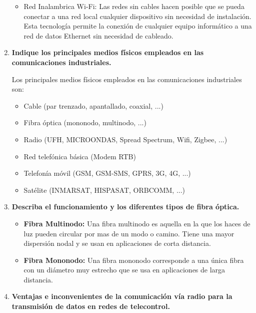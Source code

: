 \documentclass[10pt,a4paper,spanish]{article}
\begin{document}
\begin{enumerate}
\begin{itemize}
      \item Red Inalambrica Wi-Fi: Las redes sin cables hacen posible que se pueda conectar a una red local cualquier dispositivo sin necesidad de instalación. Esta tecnología permite la conexión de cualquier equipo informático a una red de datos Ethernet sin necesidad de cableado.
    \end{itemize}

    \noindent

    \item \textbf{Indique los principales medios físicos empleados en las comunicaciones industriales.}

    \noindent
    Los principales medios físicos empleados en las comunicaciones industriales son:

    \begin{itemize}
      \item Cable (par trenzado, apantallado, coaxial, ...)
      \item Fibra óptica (mononodo, multinodo, ...)
      \item Radio (UFH, MICROONDAS, Spread Spectrum, Wifi, Zigbee, ...)
      \item Red telefónica básica (Modem RTB)
      \item Telefonía móvil (GSM, GSM-SMS, GPRS, 3G, 4G, ...)
      \item Satélite (INMARSAT, HISPASAT, ORBCOMM, ...)
    \end{itemize}

    \newpage
    \item \textbf{Describa el funcionamiento y los diferentes tipos de fibra óptica.}

    \noindent
    \begin{itemize}
      \item \textbf{Fibra Multinodo: } Una fibra multinodo es aquella en la que los haces de luz pueden circular por mas de un modo o camino. Tiene una mayor dispersión nodal y se usan en aplicaciones de corta distancia.

      \item \textbf{Fibra Mononodo: } Una fibra mononodo corresponde a una única fibra con un diámetro muy estrecho que se usa en aplicaciones de larga distancia.
    \end{itemize}

    \item \textbf{Ventajas e inconvenientes de la comunicación vía radio para la transmisión de datos en redes de telecontrol.}


\end{enumerate}
\end{document}
